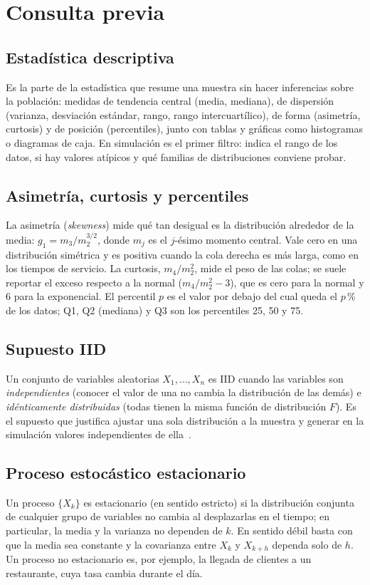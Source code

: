 \documentclass[conference]{IEEEtran}
\begin{document}
\section{Consulta previa}
\subsection{Estadística descriptiva}
Es la parte de la estadística que resume una muestra sin hacer inferencias sobre la población: medidas de tendencia central (media, mediana), de dispersión (varianza, desviación estándar, rango, rango intercuartílico), de forma (asimetría, curtosis) y de posición (percentiles), junto con tablas y gráficas como histogramas o diagramas de caja. En simulación es el primer filtro: indica el rango de los datos, si hay valores atípicos y qué familias de distribuciones conviene probar.

\subsection{Asimetría, curtosis y percentiles}
La asimetría (\emph{skewness}) mide qué tan desigual es la distribución alrededor de la media: $g_1=m_3/m_2^{3/2}$, donde $m_j$ es el $j$-ésimo momento central. Vale cero en una distribución simétrica y es positiva cuando la cola derecha es más larga, como en los tiempos de servicio. La curtosis, $m_4/m_2^2$, mide el peso de las colas; se suele reportar el exceso respecto a la normal ($m_4/m_2^2-3$), que es cero para la normal y 6 para la exponencial. El percentil $p$ es el valor por debajo del cual queda el $p$\,\% de los datos; Q1, Q2 (mediana) y Q3 son los percentiles 25, 50 y 75.

\subsection{Supuesto IID}
Un conjunto de variables aleatorias $X_1,\dots,X_n$ es IID cuando las variables son \emph{independientes} (conocer el valor de una no cambia la distribución de las demás) e \emph{idénticamente distribuidas} (todas tienen la misma función de distribución $F$). Es el supuesto que justifica ajustar una sola distribución a la muestra y generar en la simulación valores independientes de ella~\cite{banks98}.

\subsection{Proceso estocástico estacionario}
Un proceso $\{X_k\}$ es estacionario (en sentido estricto) si la distribución conjunta de cualquier grupo de variables no cambia al desplazarlas en el tiempo; en particular, la media y la varianza no dependen de $k$. En sentido débil basta con que la media sea constante y la covarianza entre $X_k$ y $X_{k+h}$ dependa solo de $h$. Un proceso no estacionario es, por ejemplo, la llegada de clientes a un restaurante, cuya tasa cambia durante el día.
\end{document}
